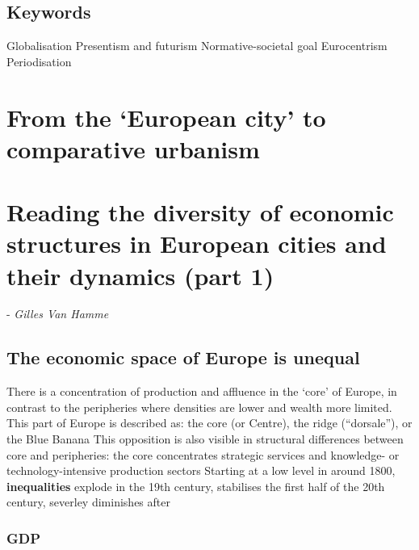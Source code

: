 \documentclass{article}
\begin{document}
\subsection{Keywords}

Globalisation
Presentism and futurism
Normative-societal goal
Eurocentrism
Periodisation


\section{From the `European city' to comparative urbanism}
\date{November th, 2021}


\section{Reading the diversity of economic structures in European cities and their dynamics (part 1)}
\date{October 18th, 2021} - \textit{Gilles Van Hamme}

\subsection{The economic space of Europe is unequal}

\begin{outline}
	\1 There is a concentration of production and affluence in the `core' of Europe, in contrast to the peripheries where densities are lower and wealth more limited. This part of Europe is described as: the core (or Centre), the ridge (``dorsale''), or the Blue Banana
	\1 This opposition is also visible in structural differences between core and peripheries: the core concentrates strategic services and knowledge- or technology-intensive production sectors
	\1 Starting at a low level in around 1800, \textbf{inequalities} explode in the 19th century, stabilises the first half of the 20th century, severley diminishes after
\end{outline}

\subsubsection{GDP}
\end{document}

